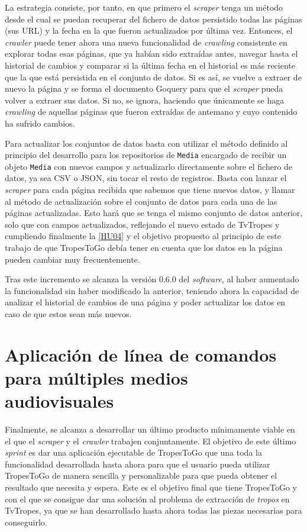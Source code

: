 La estrategia consiste, por tanto, en que primero el \textit{scraper} tenga un
método desde el cual se puedan recuperar del fichero de datos persistido todas
las páginas (sus URL) y la fecha en la que fueron actualizados por última vez.
Entonces, el \textit{crawler} puede tener ahora una nueva funcionalidad de
\textit{crawling} consistente en explorar todas esas páginas, que ya habían sido
extraídas antes, navegar hasta el historial de cambios y comparar si la última
fecha en el historial es más reciente que la que está persistida en el conjunto
de datos. Si es así, se vuelve a extraer de nuevo la página y se forma el
documento Goquery para que el \textit{scraper} pueda volver a extraer sus datos.
Si no, se ignora, haciendo que únicamente se haga \textit{crawling} de aquellas
páginas que fueron extraídas de antemano y cuyo contenido ha sufrido cambios.

Para actualizar los conjuntos de datos basta con utilizar el método definido al
principio del desarrollo para los repositorios de \texttt{Media} encargado de
recibir un objeto \texttt{Media} con nuevos campos y actualizarlo directamente
sobre el fichero de datos, ya sea CSV o JSON, sin tocar el resto de registros.
Basta con lanzar el \textit{scraper} para cada página recibida que sabemos que
tiene nuevos datos, y llamar al método de actualización sobre el conjunto de
datos para cada una de las páginas actualizadas. Esto hará que se tenga el mismo
conjunto de datos anterior, solo que con campos actualizados, reflejando el
nuevo estado de TvTropes y cumpliendo finalmente la
\href{https://github.com/jlgallego99/TropesToGo/issues/9}{[HU04]} y el objetivo
propuesto al principio de este trabajo de que TropesToGo debía tener en cuenta
que los datos en la página pueden cambiar muy frecuentemente.

Tras este incremento se alcanza la versión 0.6.0 del \textit{software}, al haber
aumentado la funcionalidad sin haber modificado la anterior, teniendo ahora la
capacidad de analizar el historial de cambios de una página y poder actualizar
los datos en caso de que estos sean más nuevos.

\section{Aplicación de línea de comandos para múltiples medios audiovisuales}
Finalmente, se alcanza a desarrollar un último producto mínimamente viable en el
que el \textit{scraper} y el \textit{crawler} trabajen conjuntamente. El
objetivo de este último \textit{sprint} es dar una aplicación ejecutable de
TropesToGo que una toda la funcionalidad desarrollada hasta ahora para que el
usuario pueda utilizar TropesToGo de manera sencilla y personalizable para que
pueda obtener el resultado que necesita y espera. Este es el objetivo final que
tiene TropesToGo y con el que se consigue dar una solución al problema de
extracción de \textit{tropos} en TvTropes, ya que se han desarrollado hasta
ahora todas las piezas necesarias para conseguirlo.

